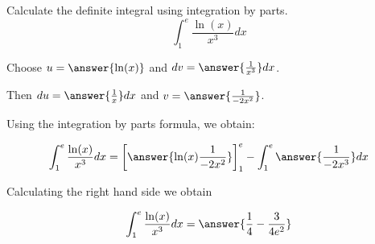 \documentclass{ximera}
\author{Jason Miller}
\begin{document}
\begin{exercise}
Calculate the definite integral using integration by parts.
\[
\int_{1}^{e} \frac{ \ln(x)}{x^{3}} dx
\]


Choose $u=\answer{ \ln(x) }$ and $dv=\answer{\frac{1}{x^{3}}} dx$. 

Then $du= \answer{ \frac{1}{x} } dx$ and $v= \answer{\frac{1}{-2x^{2}}}$.

Using the integration by parts formula, we obtain:

\[
\int_{1}^{e} \frac{ \ln(x)}{x^{3}} dx= \bigg[\answer{  \ln(x) \frac{1}{-2x^{2}}}\bigg]_1^e - \int_{1}^{e} \answer{ \frac{1}{-2x^{3}}}  dx
\]

Calculating the right hand side we obtain

\[
\int_{1}^{e} \frac{ \ln(x)}{x^{3}} dx= \answer{\frac{1}{4} - \frac{3}{4e^{2}} }
\]


\end{exercise}
\end{document}
